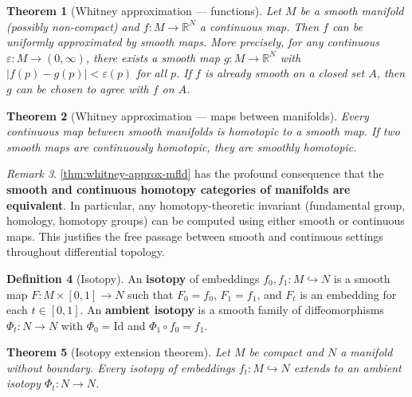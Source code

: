 \documentclass[12pt,a4paper,openany]{book}
\newtheorem{theorem}{Theorem}[section]
\theoremstyle{definition}
\newtheorem{definition}[theorem]{Definition}
\theoremstyle{remark}
\newtheorem{remark}[theorem]{Remark}
\newcommand{\R}{\mathbb{R}}
\newcommand{\Id}{\mathrm{Id}}
\newcommand{\abs}[1]{\left\lvert #1 \right\rvert}
\begin{document}
\begin{theorem}[Whitney approximation --- functions]\label{thm:whitney-approx-func}
Let $M$ be a smooth manifold (possibly non-compact) and
$f\colon M \to \R^N$ a continuous map. Then $f$ can be uniformly
approximated by smooth maps. More precisely, for any continuous
$\varepsilon\colon M \to (0,\infty)$, there exists a smooth map
$g\colon M \to \R^N$ with $\abs{f(p)-g(p)} < \varepsilon(p)$ for all $p$.
If $f$ is already smooth on a closed set $A$, then $g$ can be chosen
to agree with $f$ on $A$.
\end{theorem}

\begin{theorem}[Whitney approximation --- maps between manifolds]\label{thm:whitney-approx-mfld}
Every continuous map between smooth manifolds is homotopic to a
smooth map. If two smooth maps are continuously homotopic, they
are smoothly homotopic.
\end{theorem}

\begin{remark}\label{rem:smooth-homotopy-category}
\autoref{thm:whitney-approx-mfld} has the profound consequence that
the \textbf{smooth and continuous homotopy categories of manifolds are equivalent}.
In particular, any homotopy-theoretic invariant (fundamental group,
homology, homotopy groups) can be computed using either smooth or
continuous maps. This justifies the free passage between smooth and
continuous settings throughout differential topology.
\end{remark}

\begin{definition}[Isotopy]\label{def:isotopy}
An \textbf{isotopy} of embeddings $f_0,f_1\colon M\hookrightarrow N$
is a smooth map $F\colon M\times[0,1]\to N$ such that $F_0=f_0$,
$F_1=f_1$, and $F_t$ is an embedding for each $t \in [0,1]$.
An \textbf{ambient isotopy} is a smooth family of diffeomorphisms
$\Phi_t\colon N \to N$ with $\Phi_0 = \Id$ and $\Phi_1\circ f_0 = f_1$.
\end{definition}

\begin{theorem}[Isotopy extension theorem]\label{thm:isotopy-extension}
Let $M$ be compact and $N$ a manifold without boundary.
Every isotopy of embeddings $f_t\colon M \hookrightarrow N$ extends
to an ambient isotopy $\Phi_t\colon N \to N$.
\end{theorem}

\end{document}
